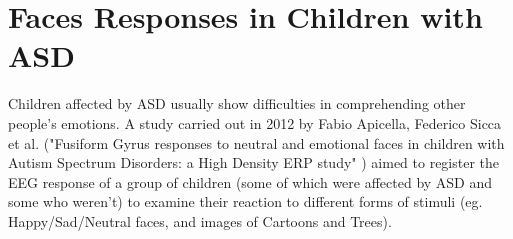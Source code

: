 




\section{Faces Responses in Children with ASD}
Children affected by ASD usually show difficulties in comprehending other people's emotions. A study carried out in 2012 by Fabio Apicella, Federico Sicca et al. ("Fusiform Gyrus responses to neutral and emotional faces in children with Autism Spectrum Disorders: a High Density ERP study" \cite{pisa}) aimed to register the EEG response of a group of children (some of which were affected by ASD and some who weren't) to examine their reaction to different forms of stimuli (eg. Happy/Sad/Neutral faces, and images of Cartoons and Trees).

